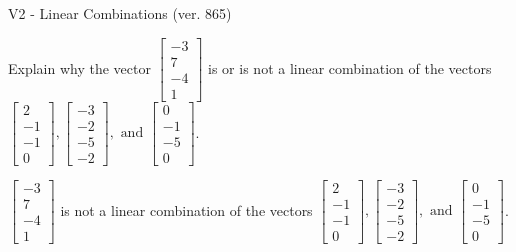 \begin{exercise}
  \begin{exerciseTitle}V2 - Linear Combinations (ver. 865)\end{exerciseTitle}
  \begin{exerciseStatement}
    Explain why the vector \(\left[\begin{array}{c}
-3 \\
7 \\
-4 \\
1
\end{array}\right]\)  is or is not a linear 
	combination of the vectors \(\left[\begin{array}{c}
2 \\
-1 \\
-1 \\
0
\end{array}\right] , \left[\begin{array}{c}
-3 \\
-2 \\
-5 \\
-2
\end{array}\right] , \text{ and } \left[\begin{array}{c}
0 \\
-1 \\
-5 \\
0
\end{array}\right]\).
	


  \end{exerciseStatement}
  \begin{exerciseAnswer}
   \(\left[\begin{array}{c}
-3 \\
7 \\
-4 \\
1
\end{array}\right]\) 
  	 is not  
	a linear combination of the vectors \(\left[\begin{array}{c}
2 \\
-1 \\
-1 \\
0
\end{array}\right] , \left[\begin{array}{c}
-3 \\
-2 \\
-5 \\
-2
\end{array}\right] , \text{ and } \left[\begin{array}{c}
0 \\
-1 \\
-5 \\
0
\end{array}\right]\).

	
  


  \end{exerciseAnswer}
\end{exercise}